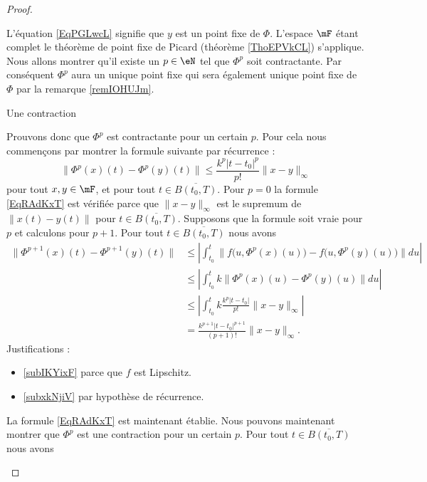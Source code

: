 \begin{proof}
\begin{subproof}
    L'équation \eqref{EqPGLwcL} signifie que \( y\) est un point fixe de \( \Phi\). L'espace \( \mF\) étant complet le théorème de point fixe de Picard (théorème \ref{ThoEPVkCL}) s'applique. Nous allons montrer qu'il existe un \( p\in\eN\) tel que \( \Phi^p\) soit contractante. Par conséquent \( \Phi^p\) aura un unique point fixe qui sera également unique point fixe de \( \Phi\) par la remarque \ref{remIOHUJm}.
    
\item[Une contraction]

    Prouvons donc que \( \Phi^p\) est contractante pour un certain \( p\). Pour cela nous commençons par montrer la formule suivante par récurrence :
    \begin{equation}        \label{EqRAdKxT}
        \big\| \Phi^p(x)(t)-\Phi^p(y)(t) \big\|\leq \frac{ k^p| t-t_0 |^p }{ p! }\| x-y \|_{\infty}
    \end{equation}
    pour tout \( x,y\in\mF\), et pour tout \( t\in\overline{ B(t_0,T) }\). Pour \( p=0\) la formule \eqref{EqRAdKxT} est vérifiée parce que \( \| x-y \|_{\infty}\) est le supremum de \( \| x(t)-y(t) \|\) pour \( t\in\overline{ B(t_0,T) }\). Supposons que la formule soit vraie pour \( p\) et calculons pour \( p+1\). Pour tout \( t\in\overline{ B(t_0,T) }\) nous avons
    \begin{subequations}
        \begin{align}
            \big\| \Phi^{p+1}(x)(t)-\Phi^{p+1}(y)(t) \big\|&\leq \left| \int_{t_0}^t\big\| f\big( u,\Phi^p(x)(u) \big)-f\big( u,\Phi^p(y)(u) \big) \big\|du \right| \\
            &\leq \left| \int_{t_0}^tk\| \Phi^p(x)(u)-\Phi^p(y)(u) \|du \right|    \label{subIKYixF}\\
            &\leq \left| \int_{t_0}^tk\frac{ k^p| t-t_0 | }{ p! }\| x-y \|_{\infty} \right| \label{subxkNjiV} \\
            &=\frac{ k^{p+1}| t-t_0 |^{p+1} }{ (p+1)! }\| x-y \|_{\infty}.
        \end{align}
    \end{subequations}
    Justifications :
    \begin{itemize}
        \item \eqref{subIKYixF} parce que \( f\) est Lipschitz.
        \item \eqref{subxkNjiV} par hypothèse de récurrence.
    \end{itemize}
    La formule \eqref{EqRAdKxT} est maintenant établie. Nous pouvons maintenant montrer que \( \Phi^p\) est une contraction pour un certain \( p\). Pour tout \( t\in \overline{ B(t_0,T) }\) nous avons

\end{subproof}
\end{proof}
